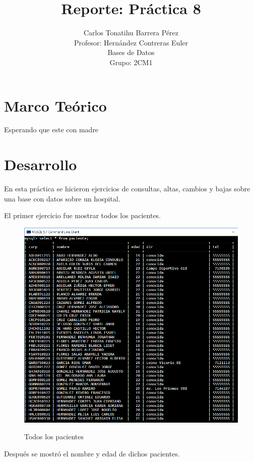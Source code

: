 \documentclass[12pt, titlepage]{article}
\title{Reporte: Práctica 8}
\author{Carlos Tonatihu Barrera Pérez \\ Profesor: Hernández Contreras Euler \\ Bases de Datos \\ Grupo: 2CM1 }
\begin{document}
	\maketitle
	\tableofcontents
	\section{Marco Teórico}
	Esperando que este con madre
	\section{Desarrollo}
	En esta práctica se hicieron ejercicios de consultas, altas, cambios y bajas sobre una base con datos sobre un hospital.
	
	El primer ejercicio fue mostrar todos los pacientes.
	\begin{figure}[H]
		\begin{center}
			\includegraphics[width=\textwidth]{img/uno.png}
			\label{fig:uno}
			\caption{Todos los pacientes}
		\end{center}
	\end{figure}
	Después se mostró el nombre y edad de dichos pacientes.
\end{document}

